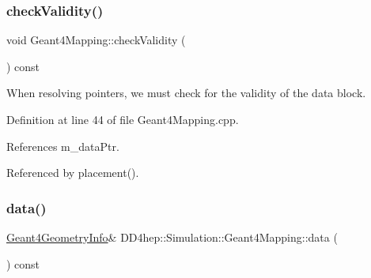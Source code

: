 \hypertarget{class_d_d4hep_1_1_simulation_1_1_geant4_mapping_a97758739af8c4f4a108d308e73b1ad0e}{}\label{class_d_d4hep_1_1_simulation_1_1_geant4_mapping_a97758739af8c4f4a108d308e73b1ad0e} 
\subsubsection{\texorpdfstring{check\+Validity()}{checkValidity()}}
{\footnotesize\ttfamily void Geant4\+Mapping\+::check\+Validity (\begin{DoxyParamCaption}{ }\end{DoxyParamCaption}) const\hspace{0.3cm}{\ttfamily [protected]}}



When resolving pointers, we must check for the validity of the data block. 



Definition at line 44 of file Geant4\+Mapping.\+cpp.



References m\+\_\+data\+Ptr.



Referenced by placement().

\hypertarget{class_d_d4hep_1_1_simulation_1_1_geant4_mapping_a6a078e8ed49fe6741f932d8dc5d3acb5}{}\label{class_d_d4hep_1_1_simulation_1_1_geant4_mapping_a6a078e8ed49fe6741f932d8dc5d3acb5} 
\subsubsection{\texorpdfstring{data()}{data()}}
{\footnotesize\ttfamily \hyperlink{class_d_d4hep_1_1_simulation_1_1_geant4_geometry_info}{Geant4\+Geometry\+Info}\& D\+D4hep\+::\+Simulation\+::\+Geant4\+Mapping\+::data (\begin{DoxyParamCaption}{ }\end{DoxyParamCaption}) const\hspace{0.3cm}{\ttfamily [inline]}}



